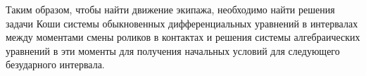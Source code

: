 Таким образом, чтобы найти движение экипажа, необходимо найти решения задачи Коши системы обыкновенных дифференциальных уравнений в интервалах между моментами смены роликов в контактах и решения системы алгебраических уравнений в эти моменты для получения начальных условий для следующего безударного интервала.
